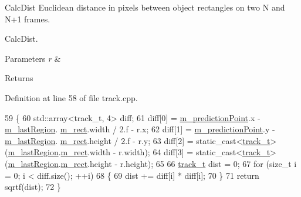 Calc\+Dist Euclidean distance in pixels between object rectangles on two N and N+1 frames. 

Calc\+Dist.


\begin{DoxyParams}{Parameters}
{\em r} & \\
\hline
\end{DoxyParams}
\begin{DoxyReturn}{Returns}

\end{DoxyReturn}


Definition at line 58 of file track.\+cpp.


\begin{DoxyCode}
59 \{
60     std::array<track\_t, 4> diff;
61     diff[0] = \mbox{\hyperlink{class_c_track_a8ee3f8baaf290aeb113f34c26a446a76}{m\_predictionPoint}}.x - \mbox{\hyperlink{class_c_track_a5af91fbfad7ebf07bd0f681f915e440c}{m\_lastRegion}}.
      \mbox{\hyperlink{class_c_region_a6f68304e90428db829cc38792fa3e1e8}{m\_rect}}.width / 2.f - r.x;
62     diff[1] = \mbox{\hyperlink{class_c_track_a8ee3f8baaf290aeb113f34c26a446a76}{m\_predictionPoint}}.y - \mbox{\hyperlink{class_c_track_a5af91fbfad7ebf07bd0f681f915e440c}{m\_lastRegion}}.
      \mbox{\hyperlink{class_c_region_a6f68304e90428db829cc38792fa3e1e8}{m\_rect}}.height / 2.f - r.y;
63     diff[2] = \textcolor{keyword}{static\_cast<}\mbox{\hyperlink{defines_8h_a7ce9c8817b42ab418e61756f579549ab}{track\_t}}\textcolor{keyword}{>}(\mbox{\hyperlink{class_c_track_a5af91fbfad7ebf07bd0f681f915e440c}{m\_lastRegion}}.\mbox{\hyperlink{class_c_region_a6f68304e90428db829cc38792fa3e1e8}{m\_rect}}.width - r.width);
64     diff[3] = \textcolor{keyword}{static\_cast<}\mbox{\hyperlink{defines_8h_a7ce9c8817b42ab418e61756f579549ab}{track\_t}}\textcolor{keyword}{>}(\mbox{\hyperlink{class_c_track_a5af91fbfad7ebf07bd0f681f915e440c}{m\_lastRegion}}.\mbox{\hyperlink{class_c_region_a6f68304e90428db829cc38792fa3e1e8}{m\_rect}}.height - r.height);
65 
66     \mbox{\hyperlink{defines_8h_a7ce9c8817b42ab418e61756f579549ab}{track\_t}} dist = 0;
67     \textcolor{keywordflow}{for} (\textcolor{keywordtype}{size\_t} i = 0; i < diff.size(); ++i)
68     \{
69         dist += diff[i] * diff[i];
70     \}
71     \textcolor{keywordflow}{return} sqrtf(dist);
72 \}
\end{DoxyCode}
\mbox{\label{class_c_track_a006369684909e91c26d11d0c2753b7ae}} 
